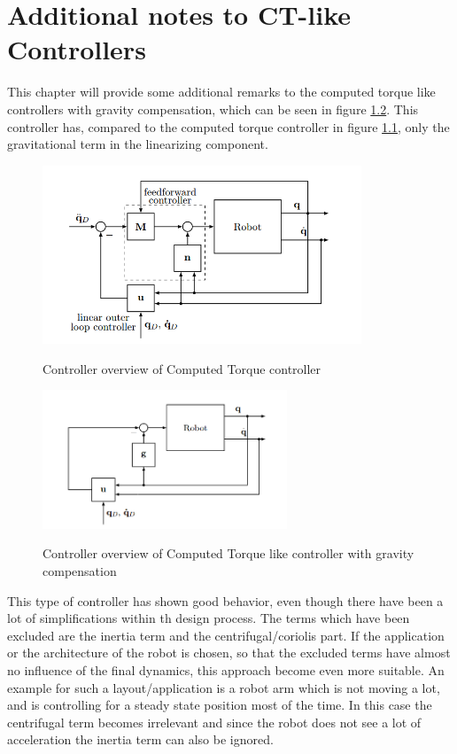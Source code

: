 \chapter{Additional notes to CT-like Controllers}

This chapter will provide some additional remarks to the computed torque like controllers with gravity compensation, which can be seen in figure \ref{fig:ctLike_overview}. This controller has, compared to the computed torque controller in figure \ref{fig:ct_overview}, only the gravitational term in the linearizing component.


\begin{figure}[H]
	\centering
	\includegraphics[width=0.85\textwidth]{pics/ct_controller.png}\\
	\caption{Controller overview of Computed Torque controller}
	\label{fig:ct_overview}
\end{figure}


\begin{figure}[H]
	\centering
	\includegraphics[width=0.65\textwidth]{pics/gravityController.png}\\
	\caption{Controller overview of Computed Torque like controller with gravity compensation}
	\label{fig:ctLike_overview}
\end{figure}

This type of controller has shown good behavior, even though there have been a lot of simplifications within th design process. The terms which have been excluded are the inertia term and the centrifugal/coriolis part. If the application or the architecture of the robot is chosen, so that the excluded terms have almost no influence of the final dynamics, this approach become even more suitable. An example for such a layout/application is a robot arm which is not moving a lot, and is controlling for a steady state position most of the time. In this case the centrifugal term becomes irrelevant and since the robot does not see a lot of acceleration the inertia term can also be ignored.\\[1cm]

